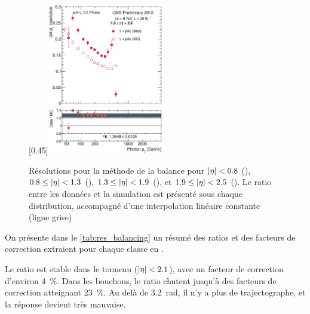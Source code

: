\begin{figure}[p]
    \subcaptionbox{\label{fig:reso_bal_eta1925}}[0.45\textwidth]{\includegraphics[width=0.45\textwidth]{chapitre4/figs/reso_balancing/resolution_eta1925_balancing.eps}}
    \caption{Résolutions pour la méthode de la balance pour $\lvert \eta \rvert < \num{0.8}$ (), $\num{0.8} \leq \lvert \eta \rvert < \num{1.3}$ (), $\num{1.3} \leq \lvert \eta \rvert < \num{1.9}$ (), et $\num{1.9} \leq \lvert \eta \rvert < \num{2.5}$ (). Le ratio entre les données et la simulation est présenté sous chaque distribution, accompagné d'une interpolation linéaire constante (ligne grise)}
    \label{fig:balancing_reso}
\end{figure}

\bigskip

On présente dans le \cref{tab:res_balancing} un résumé des ratios et des facteurs de correction extraient pour chaque classe en \aeta.

Le ratio est stable dans le tonneau ($\lvert \eta \rvert < \num{2.1}$), avec un facteur de correction d'environ \SI{4}{\%}. Dans les bouchons, le ratio chutent jusqu'à des facteurs de correction atteignant \SI{23}{\%}. Au delà de \SI{3.2}{\radian}, il n'y a plus de trajectographe, et la réponse devient très mauvaise.

